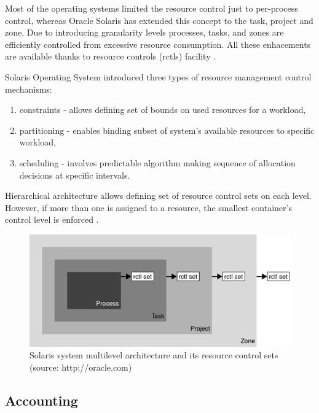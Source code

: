 \documentclass[11pt]{book}
\begin{document}
      Most of the operating systems limited the resource control just to per-process control, whereas Oracle Solaris has
      extended this concept to the task, project and zone. Due to introducing granularity levels processes, tasks, and 
      zones are efficiently controlled from excessive resource consumption. All these enhacements are available thanks 
      to resource controls (rctls) facility \cite{oracle_admin_guide}.
      
      Solaris Operating System introduced three types of resource management control mechanisms:

      \begin{enumerate}
        \item constraints - allows defining set of bounds on used resources for a workload,
        \item partitioning - enables binding subset of system's available resources to specific workload,
        \item scheduling - involves predictable algorithm making sequence of allocation decisions at specific intervals.
      \end{enumerate}

      Hierarchical architecture allows defining set of resource control sets on each level. However, if more than one is
      assigned to a resource, the smallest container's control level is enforced \cite{oracle_admin_guide}. 

      \begin{figure}[H]
        \begin{center}
          \includegraphics[width=.7\textwidth]{img/rctrl.png}
        \end{center}
        
        \caption{Solaris system multilevel architecture and its resource control sets (source: http://oracle.com)} %
		  \end{figure}


      \subsection{Accounting}
      \label{sub:sol:acct}
\end{document}
